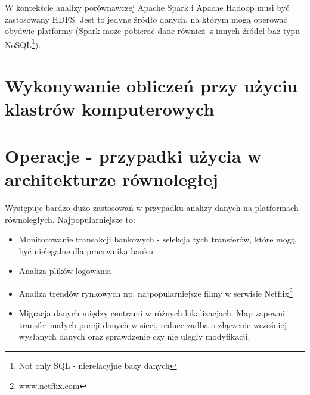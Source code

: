 \newline W kontekście analizy porównawczej Apache Spark i Apache Hadoop musi być zastosowany HDFS. Jest to jedyne źródło danych, na którym mogą operować obydwie platformy (Spark może pobierać dane również z innych źródeł baz typu NoSQL\footnote{Not only SQL - nierelacyjne bazy danych}).
\section{Wykonywanie obliczeń przy użyciu klastrów komputerowych}
\section{Operacje - przypadki użycia w architekturze równoległej}
Występuje bardzo dużo zastosowań w przypadku analizy danych na platformach równoległych. Najpopularniejsze to:
\begin{itemize}
	\item Monitorowanie transakcji bankowych - selekcja tych transferów, które mogą być nielegalne dla pracownika banku
	\item Analiza plików logowania
	\item Analiza trendów rynkowych np. najpopularniejsze filmy w serwisie Netflix\footnote{www.netflix.com}
	\item Migracja danych między centrami w różnych lokalizacjach. Map zapewni transfer małych porcji danych w sieci, reduce zadba o złączenie wcześniej wysłanych danych oraz sprawdzenie czy nie uległy modyfikacji. 
\end{itemize}